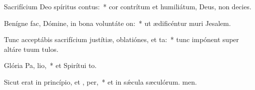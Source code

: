 \item Sacrifícium Deo spíritus contus:~* cor contrítum et humiliátum, Deus, non decies.
\item Benígne fac, Dómine, in bona voluntáte  on:~* ut ædificéntur muri Jesalem.
\item Tunc acceptábis sacrifícium justítiæ, oblatiónes, et ta:~* tunc impónent super altáre tuum tulos.
\item Glória Pa,  lio,~* et Spirítui to.
\item Sicut erat in princípio, et ,  per,~* et in sǽcula sæculórum. men.
